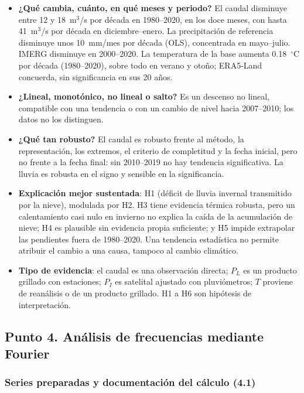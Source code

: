 \documentclass[11pt,a4paper]{article}
\newcommand{\PL}{P_L}
\newcommand{\PI}{P_I}
\begin{document}
\begin{purplebox}[title={Síntesis del punto 3}]
\begin{itemize}[leftmargin=*]
\item \textbf{¿Qué cambia, cuánto, en qué meses y periodo?} El caudal disminuye entre 12 y 18~m$^3$/s por década en 1980--2020, en los doce meses, con hasta 41~m$^3$/s por década en diciembre--enero. La precipitación de referencia disminuye unos 10~mm/mes por década (OLS), concentrada en mayo--julio. IMERG disminuye en 2000--2020. La temperatura de la base aumenta 0.18~$^\circ$C por década (1980--2020), sobre todo en verano y otoño; ERA5-Land concuerda, sin significancia en sus 20 años.
\item \textbf{¿Lineal, monotónico, no lineal o salto?} Es un descenso no lineal, compatible con una tendencia o con un cambio de nivel hacia 2007--2010; los datos no los distinguen.
\item \textbf{¿Qué tan robusto?} El caudal es robusto frente al método, la representación, los extremos, el criterio de completitud y la fecha inicial, pero no frente a la fecha final: sin 2010--2019 no hay tendencia significativa. La lluvia es robusta en el signo y sensible en la significancia.
\item \textbf{Explicación mejor sustentada}: H1 (déficit de lluvia invernal transmitido por la nieve), modulada por H2. H3 tiene evidencia térmica robusta, pero un calentamiento casi nulo en invierno no explica la caída de la acumulación de nieve; H4 es plausible sin evidencia propia suficiente; y H5 impide extrapolar las pendientes fuera de 1980--2020. Una tendencia estadística no permite atribuir el cambio a una causa, tampoco al cambio climático.
\item \textbf{Tipo de evidencia}: el caudal es una observación directa; $\PL$ es un producto grillado con estaciones; $\PI$ es satelital ajustado con pluviómetros; $T$ proviene de reanálisis o de un producto grillado. H1 a H6 son hipótesis de interpretación.
\end{itemize}
\end{purplebox}
\subsection{Punto 4. Análisis de frecuencias mediante Fourier}
\label{sec:p4}

\subsubsection{Series preparadas y documentación del cálculo (4.1)}
\end{document}
